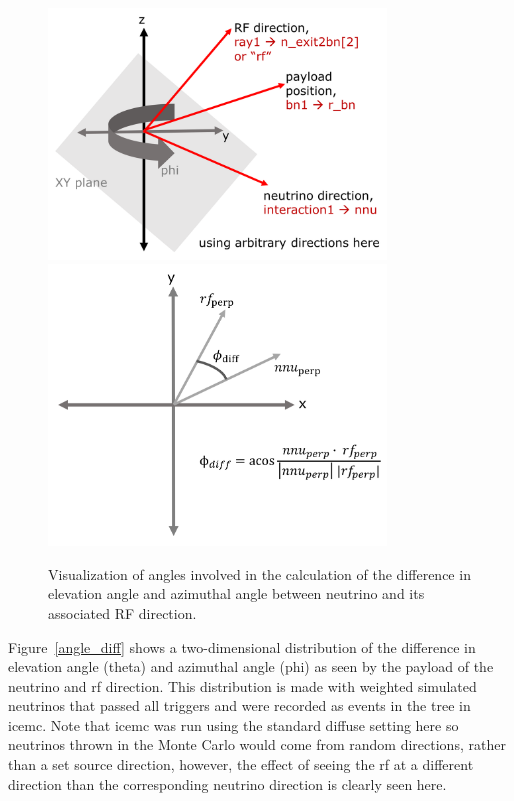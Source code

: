 \begin{figure}
\centering
\includegraphics[width=0.8\textwidth]
{figures/getting_nnu_rf.png}
\includegraphics[width=0.8\textwidth]
{figures/rf_nnu_perp.png}
\caption{Visualization of angles involved in the calculation of the difference in elevation angle and azimuthal angle between neutrino and its associated RF direction. }
\label{getting_angles}
\end{figure}

Figure~\ref{angle_diff} shows a two-dimensional distribution of the difference in elevation angle (theta) and azimuthal angle (phi) as seen by the payload of the neutrino and \gls{rf} direction. This distribution is made with weighted simulated neutrinos that passed all triggers and were recorded as events in the  tree in icemc. Note that icemc was run using the standard diffuse setting here so neutrinos thrown in the Monte Carlo would come from random directions, rather than a set source direction, however, the effect of seeing the \gls{rf} at a different direction than the corresponding neutrino direction is clearly seen here.  


